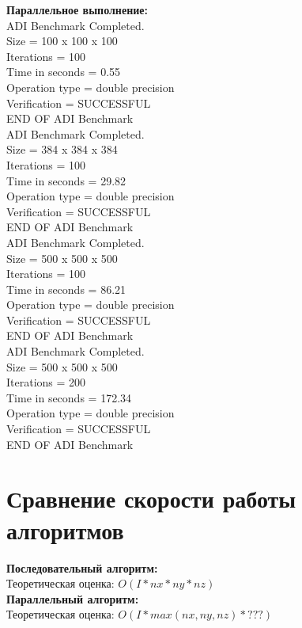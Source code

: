 \documentclass[a4paper,12pt,titlepage,draft]{article}
\begin{document}
\begin{minipage}{.45\textwidth}
\textbf{Параллельное выполнение:}\\

 ADI Benchmark Completed.\\
 Size            =  100 x  100 x  100\\
 Iterations      =                100\\
 Time in seconds =               0.55\\
 Operation type  =   double precision\\
 Verification    =         SUCCESSFUL\\
 END OF ADI Benchmark\\

 ADI Benchmark Completed.\\
 Size            =  384 x  384 x  384\\
 Iterations      =                100\\
 Time in seconds =              29.82\\
 Operation type  =   double precision\\
 Verification    =         SUCCESSFUL\\
 END OF ADI Benchmark\\

 ADI Benchmark Completed.\\
 Size            =  500 x  500 x  500\\
 Iterations      =                100\\
 Time in seconds =              86.21\\
 Operation type  =   double precision\\
 Verification    =         SUCCESSFUL\\
 END OF ADI Benchmark\\

 ADI Benchmark Completed.\\
 Size            =  500 x  500 x  500\\
 Iterations      =                200\\
 Time in seconds =             172.34\\
 Operation type  =   double precision\\
 Verification    =         SUCCESSFUL\\
 END OF ADI Benchmark\\

\end{minipage}
\newpage
\section{Сравнение скорости работы алгоритмов}
\textbf{Последовательный алгоритм:}\\

Теоретическая оценка: $O(I * nx * ny * nz)$\\

\textbf{Параллельный алгоритм:}\\

Теоретическая оценка: $O(I * max(nx, ny, nz) * ???)$
\end{document}
